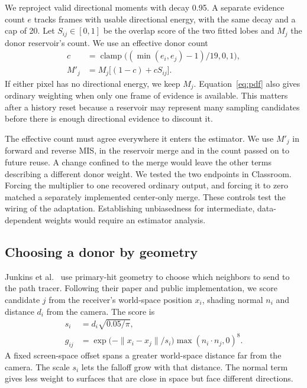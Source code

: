 \documentclass[a4paper,twocolumn]{article}
\begin{document}
We reproject valid directional moments with decay 0.95. A separate evidence count $e$ tracks frames with usable directional energy, with the same decay and a cap of 20. Let $S_{ij}\in[0,1]$ be the overlap score of the two fitted lobes and $M_j$ the donor reservoir's count. We use an effective donor count
\begin{align}
c &= \operatorname{clamp}\big((\min(e_i,e_j)-1)/19,0,1\big),\nonumber\\
M'_j &= M_j\big[(1-c)+cS_{ij}\big]. \label{eq:pdf}
\end{align}
If either pixel has no directional energy, we keep $M_j$. Equation~\ref{eq:pdf} also gives ordinary weighting when only one frame of evidence is available. This matters after a history reset because a reservoir may represent many sampling candidates before there is enough directional evidence to discount it.

The effective count must agree everywhere it enters the estimator. We use $M'_j$ in forward and reverse MIS, in the reservoir merge and in the count passed on to future reuse. A change confined to the merge would leave the other terms describing a different donor weight. We tested the two endpoints in Classroom. Forcing the multiplier to one recovered ordinary output, and forcing it to zero matched a separately implemented center-only merge. These controls test the wiring of the adaptation. Establishing unbiasedness for intermediate, data-dependent weights would require an estimator analysis.

\subsection{Choosing a donor by geometry}
Junkins et al.~\cite{junkins} use primary-hit geometry to choose which neighbors to send to the path tracer. Following their paper and public implementation, we score candidate $j$ from the receiver's world-space position $x_i$, shading normal $n_i$ and distance $d_i$ from the camera. The score is
\begin{align}
s_i &= d_i\sqrt{0.05/\pi},\nonumber\\
g_{ij} &= \exp\big(-\|x_i-x_j\|/s_i\big)
           \max(n_i\cdot n_j,0)^8. \label{eq:cgns}
\end{align}
A fixed screen-space offset spans a greater world-space distance far from the camera. The scale $s_i$ lets the falloff grow with that distance. The normal term gives less weight to surfaces that are close in space but face different directions.
\end{document}
